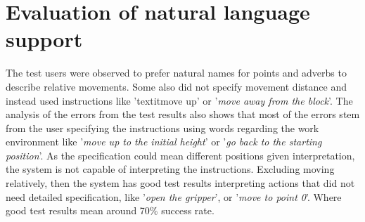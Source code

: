 \section{Evaluation of natural language support}
The test users were observed to prefer natural names for points and adverbs to describe relative movements. Some also did not specify movement distance and instead used instructions like 'textit{move up}' or '\textit{move away from the block}'.
The analysis of the errors from the test results also shows that most of the errors stem from the user specifying the instructions using words regarding the work environment like '\textit{move up to the initial height}' or '\textit{go back to the starting position}'. As the specification could mean different positions given interpretation, the system is not capable of interpreting the instructions.
Excluding moving relatively, then the system has good test results interpreting actions that did not need detailed specification, like '\textit{open the gripper}', or '\textit{move to point 0}'. Where good test results mean around 70\% success rate.
